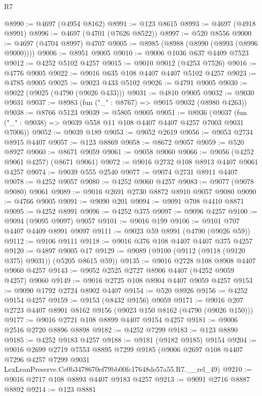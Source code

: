 \begin{lexlean}{R7}
\begin{coremodule}
@8990 := @4697 (@4954 @8162)
@8991 := @123 @8615
@8993 := @4697 (@4918 @8991)
@8996 := @4697 (@4701 (@7626 @8522))
@8997 := @520 @8556
@9000 := @4697 (@4704 @8997) @4707
@9005 := @8985 (@8988 (@8990 (@8993 (@8996 @9000))))
@9006 := @8951 @9005
@9010 := @9006 @1036 @637 @4409 @7523
@9012 := @4252 @5102 @4257
@9015 := @9010 @9012 (@4253 @7526)
@9016 := @4776 @9005
@9022 := @9016 @635 @108 @4407 @4407 @5102 @4257
@9023 := @4785 @9005
@9025 := @9023 @433 @5102
@9026 := @4791 @9005
@9030 := @9022 (@9025 (@4790 (@9026 @433)))
@9031 := @4810 @9005
@9032 := @9030 @9031
@9037 := @8983 (fun ("_" : @8767) => @9015 @9032 (@8980 @4263))
@9038 := @8766 @5123
@9039 := @5805 @9005
@9051 := @8936
    (@9037 (fun ("_" : @9038) => @9039 @558 @11 @108 @4407 @4407 @4257 @7003 @9031 @7006))
@9052 := @9039 @189
@9053 := @9052 @2619
@9056 := @9053 @2734 @8915 @4407
@9057 := @123 @8869
@9058 := @8672 @9057
@9059 := @520 @8927
@9060 := @8671 @9059
@9061 := @9058 @9060
@9066 := @9056 (@4252 @9061 @4257) (@8671 @9061)
@9072 := @9016 @2732 @108 @8913 @4407 @9061 @4257
@9074 := @9039 @555 @2540
@9077 := @9074 @2731 @8911 @4407
@9078 := @4252 @9057
@9080 := @4252 @9060 @4257
@9083 := @9077 (@9078 @9080) @9061
@9089 := @9016 @2691 @2730 @8872 @8910 @9057 @9080
@9090 := @4766 @9005
@9091 := @9090 @201
@9094 := @9091 @708 @4410 @8871
@9095 := @4252 @8991
@9096 := @4252 @375
@9097 := @9096 @4257
@9100 := @9094 (@9095 @9097) @9057
@9101 := @9016 @199
@9106 := @9101 @707 @4407 @4409 @8991 @9097
@9111 := @9023 @59 @8991 (@4790 (@9026 @59))
@9112 := @9106 @9111
@9118 := @9016 @376 @108 @4407 @4407 @375 @4257
@9120 := @4897 @9005 @17
@9129 := @9089 (@9100 (@9112 (@9118 (@9120 @375) @9031)) (@5205 @8615 @59))
@9135 := @9016 @2728 @108 @8908 @4407 @9060 @4257
@9143 := @9052 @2525 @2727 @8906 @4407 (@4252 @9059 @4257) @9060
@9149 := @9016 @2725 @108 @8904 @4407 @9059 @4257
@9153 := @9090 @1792 @2724 @8902 @4407
@9154 := @520 @8926
@9156 := @4252 @9154 @4257
@9159 := @9153 (@8432 @9156) @9059
@9171 := @9016 @207 @2723 @4407 @8901 @8162 @9156 (@9023 @150 @8162 (@4790 (@9026 @150)))
@9177 := @9016 @2721 @108 @8899 @4407 @9154 @4257
@9181 := @9006 @2516 @2720 @8896 @8898
@9182 := @4252 @7299
@9183 := @123 @8890
@9185 := @4252 @9183 @4257
@9188 := @9181 (@9182 @9185) @9154
@9204 := @9016
    @2699
    @2719
    @7553
    @8895
    @7299
    @9185
    (@9006
      @2697
      @108
      @4407
      @7296
      @4257
      @7299
      @9031
      LexLeanPreserve.Ce0b3478670ef79bb00fc17648de57a55.R7.__rel_49)
@9210 := @9016 @2717 @108 @8893 @4407 @9183 @4257
@9213 := @9091 @2716 @8887 @8892
@9214 := @123 @8881

\end{coremodule}
\end{lexlean}
